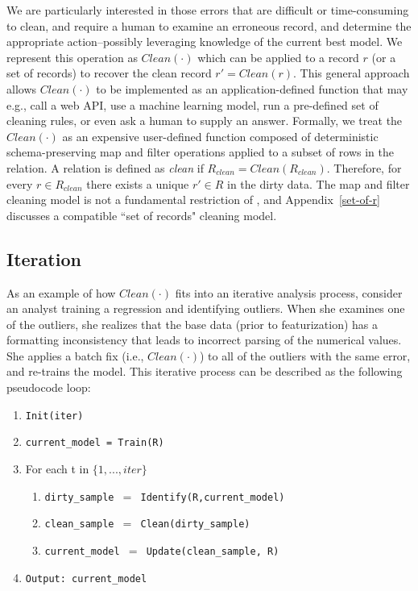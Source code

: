 We are particularly interested in those errors that are difficult or time-consuming to clean, and require a human to examine an erroneous record, and determine the appropriate action--possibly leveraging knowledge of the current best model.
We represent this operation as $Clean(\cdot)$ which can be applied to a record $r$ (or a set of records) to recover the clean record $r' = Clean(r)$.
This general approach allows $Clean(\cdot)$ to be implemented as an application-defined function that may e.g., call a web API, use a machine learning model, run a pre-defined set of cleaning rules, or even ask a human to supply an answer.
Formally, we treat the $Clean(\cdot)$ as an expensive user-defined function composed of deterministic schema-preserving \textsf{map} and \textsf{filter} operations applied to a subset of rows in the relation.
A relation is defined as \emph{clean} if $R_{clean} = Clean(R_{clean})$.
Therefore, for every $r \in R_{clean}$ there exists a unique $r' \in R$ in the dirty data.
The \textsf{map} and \textsf{filter} cleaning model is not a fundamental restriction of \sys, and Appendix~\ref{set-of-r} discusses a compatible ``set of records" cleaning model.

\subsection{Iteration}
As an example of how $Clean(\cdot)$ fits into an iterative analysis process, consider an analyst training a regression and identifying outliers. 
When she examines one of the outliers, she realizes that the base data (prior to featurization) has a formatting inconsistency that leads to incorrect parsing of the numerical values.
She applies a batch fix (i.e., $Clean(\cdot)$) to all of the outliers with the same error, and re-trains the model. 
This iterative process can be described as the following pseudocode loop:
\begin{enumerate}[leftmargin=1em]\scriptsize\sloppy
  \item \texttt{Init(iter)}
  \item \texttt{current\_model = Train(R)}
  \item For each t in $\{1,...,iter\}$
  \begin{enumerate}
    \item \texttt{dirty\_sample $=$ Identify(R,current\_model)}
    \item \texttt{clean\_sample $=$ Clean(dirty\_sample)}
    \item \texttt{current\_model $=$ Update(clean\_sample, R)}
  \end{enumerate}
  \item \texttt{Output: current\_model}
  \end{enumerate}

